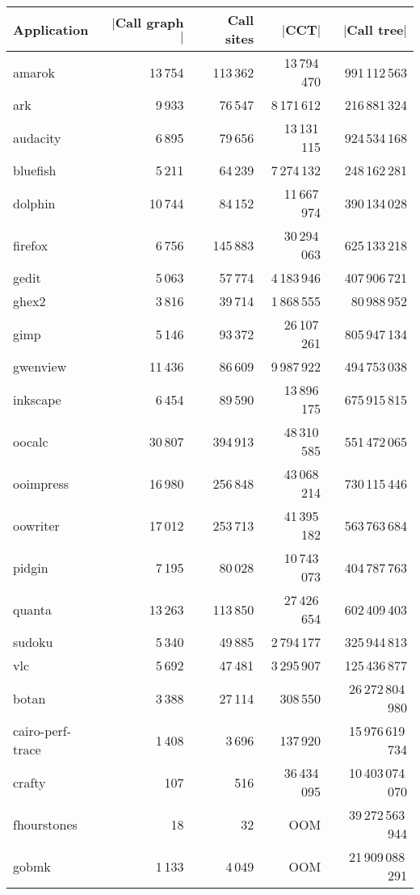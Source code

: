 \begin{table}[ht]
\begin{center}
\begin{tabular}{|l|r r r r|}
\hline
Application & $|$Call graph$|$ & Call sites & $|$CCT$|$ & $|$Call tree$|$\\
\hline
amarok & 13\,754 & 113\,362 & 13\,794\,470 & 991\,112\,563 \\
ark & 9\,933 & 76\,547 & 8\,171\,612 & 216\,881\,324 \\
audacity & 6\,895 & 79\,656 & 13\,131\,115 & 924\,534\,168 \\
bluefish & 5\,211 & 64\,239 & 7\,274\,132 & 248\,162\,281 \\
dolphin & 10\,744 & 84\,152 & 11\,667\,974 & 390\,134\,028 \\
firefox & 6\,756 & 145\,883 & 30\,294\,063 & 625\,133\,218 \\
gedit & 5\,063 & 57\,774 & 4\,183\,946 & 407\,906\,721 \\
ghex2 & 3\,816 & 39\,714 & 1\,868\,555 & 80\,988\,952 \\
gimp & 5\,146 & 93\,372 & 26\,107\,261 & 805\,947\,134 \\
gwenview & 11\,436 & 86\,609 & 9\,987\,922 & 494\,753\,038 \\
inkscape & 6\,454 & 89\,590 & 13\,896\,175 & 675\,915\,815 \\
oocalc & 30\,807 & 394\,913 & 48\,310\,585 & 551\,472\,065 \\
ooimpress & 16\,980 & 256\,848 & 43\,068\,214 & 730\,115\,446 \\
oowriter & 17\,012 & 253\,713 & 41\,395\,182 & 563\,763\,684 \\
pidgin & 7\,195 & 80\,028 & 10\,743\,073 & 404\,787\,763 \\
quanta & 13\,263 & 113\,850 & 27\,426\,654 & 602\,409\,403 \\
sudoku & 5\,340 & 49\,885 & 2\,794\,177 & 325\,944\,813 \\
vlc & 5\,692 & 47\,481 & 3\,295\,907 & 125\,436\,877 \\
botan & 3\,388 & 27\,114 & 308\,550 & 26\,272\,804\,980 \\
cairo-perf-trace & 1\,408 & 3\,696 & 137\,920 & 15\,976\,619\,734 \\
crafty & 107 & 516 & 36\,434\,095 & 10\,403\,074\,070 \\
fhourstones & 18 & 32 & OOM & 39\,272\,563\,944 \\
gobmk & 1\,133 & 4\,049 & OOM & 21\,909\,088\,291 \\

\end{tabular}
\end{center}
\end{table}
